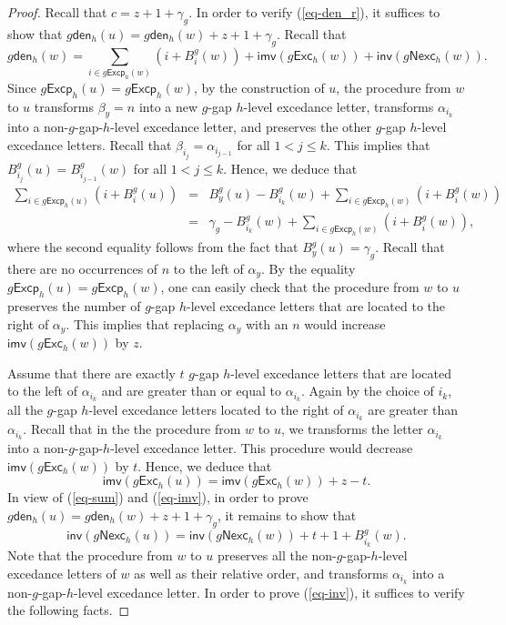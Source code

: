 \documentclass[12pt]{article}
\numberwithin{equation}{section}
\theoremstyle{plain}
\def\den{\mathsf{den}}
\def\Exc{\mathsf{Exc}}
\def\Nexc{\mathsf{Nexc}}
\def\Excp{\mathsf{Excp}}
\def\inv{\mathsf{inv}}
\def\imv{\mathsf{imv}}
\begin{document}
\begin{proof}
Recall that $c=z+1+\gamma_g$. 
  In order to verify (\ref{eq-den_r}), it suffices to show that $g\den_h(u)=g\den_h(w)+z+1+\gamma_g$. 
Recall that 
$$
g\den_h(w)=\sum\limits_{i\in g\Excp_h(w)}(i+B^g_i(w)) +{\imv}(g\Exc_h(w))+{\inv}(g\Nexc_h (w)).
$$
Since $g\Excp_h(u)=g\Excp_h(w)$,  by the construction of $u$, the procedure from $w$ to $u$ transforms $\beta_{y}=n$ into a new $g$-gap $h$-level excedance letter, transforms $\alpha_{i_k}$ into a non-$g$-gap-$h$-level excedance letter, and preserves the other $g$-gap $h$-level excedance letters. Recall that 
$\beta_{i_j}=\alpha_{i_{j-1}}$ for all $1<j\leq k$. This implies that $B^g_{i_j}(u)=B^g_{i_{j-1}}(w)$ for all $1<j\leq k$. 
 Hence, we deduce that 
\begin{equation}\label{eq-sum}
	\begin{array}{lll}
\sum\limits_{i\in g\Excp_h(u)} (i+B^g_i(u))&=&B^g_{y}(u)-B^g_{i_k}(w)+\sum\limits_{i\in g\Excp_h(w)} (i+B^g_i(w))\\
&=&\gamma_g-B^g_{i_k}(w)+\sum\limits_{i\in g\Excp_h(w)} (i+B^g_i(w)),
\end{array}
\end{equation} 
  where  the second equality follows from the fact that  $B^g_y(u)=\gamma_g$.  
  Recall that there are no occurrences of $n$ to the left of $\alpha_y$. 
By the  equality $g\Excp_h(u)=g\Excp_h(w)$,  one can easily check that the procedure from $w$ to $u$ preserves the number of $g$-gap $h$-level excedance letters that are located to the right of $\alpha_y$. This implies that replacing $\alpha_{y}$ with  an $n$ would increase  ${\imv}(g\Exc_h(w))$ by $z$. 

Assume that there are exactly $t$ $g$-gap $h$-level excedance letters that are located to the left of $\alpha_{i_{k}}$ and  are greater than or equal to $\alpha_{i_k}$. Again by the choice  of $i_k$, all the $g$-gap $h$-level excedance letters located to the right of $\alpha_{i_k}$ are greater  than $\alpha_{i_k}$.  Recall that in the  the procedure from $w$ to $u$, we  transforms the letter  $\alpha_{i_k}$ into a non-$g$-gap-$h$-level excedance letter.    This procedure would decrease ${\imv}(g\Exc_h(w))$ by $t$.   Hence, we deduce that \begin{equation}\label{eq-imv}
	{\imv}(g\Exc_h(u))={\imv}(g\Exc_h(w))+z-t.
\end{equation}
In view of  (\ref{eq-sum}) and (\ref{eq-imv}), in order to prove $g\den_h(u)=g\den_h(w)+z+1+\gamma_g$, it remains to show that 
\begin{equation}\label{eq-inv}
	{\inv}(g\Nexc_h(u))={\inv}(g\Nexc_h(w))+t+1+B^g_{i_k}(w).
\end{equation} 
 Note that the procedure from $w$ to $u$  preserves    all the non-$g$-gap-$h$-level excedance letters of $w$ as well as their relative order,  and transforms  $\alpha_{i_k}$ into a non-$g$-gap-$h$-level excedance letter.  In order to prove (\ref{eq-inv}),  it suffices to  verify the following facts.


\end{proof}
\end{document}
